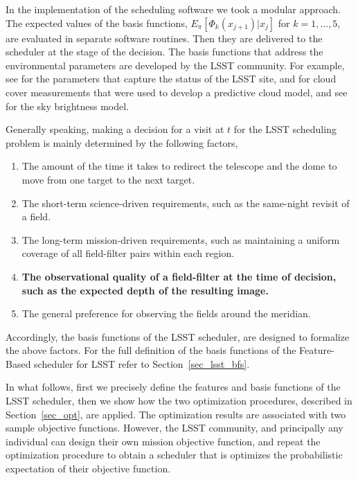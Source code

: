 \documentclass[12pt]{aastex62}
\theoremstyle{definition}
\begin{document}
In the implementation of the scheduling software we took a modular approach. The expected values of the basis functions, $E_{\pi}[\Phi_k(x_{j+1})|x_j]$ for $k=1,\dots, 5$, are evaluated in separate software routines. Then they are delivered to the scheduler at the stage of the decision. The basis functions that address the environmental parameters are developed by the LSST community. For example, see \citep{2014SPIE.9145E..1AG} for the parameters that capture the status of the LSST site, \citep{sebag2008lsst} and \citep{sebag2007lsst} for cloud cover measurements that were used to develop a predictive cloud model, and see \citep{yoachim2016optical} for the sky brightness model. 

Generally speaking, making a decision for a visit at $t$ for the LSST scheduling problem is mainly determined by the following factors,
\begin{enumerate}
\item The amount of the time it takes to redirect the telescope and the dome to move from one target to the next target.
\item The short-term science-driven requirements, such as the same-night revisit of a field.
\item The long-term mission-driven requirements, such as maintaining a uniform coverage of all field-filter pairs within each region.
\item {\bf The observational quality of a field-filter at the time of decision, such as the expected depth of the resulting image. \bf}
\item The general preference for observing the fields around the meridian.
\end{enumerate}

Accordingly, the basis functions of the LSST scheduler, are designed to formalize the above factors. For the full definition of the basis functions of the Feature-Based scheduler for LSST refer to Section~\ref{sec_lsst_bfs}.

In what follows, first we precisely define the features and basis functions of the LSST scheduler, then we show how the two optimization procedures, described in Section~\ref{sec_opt}, are applied. The optimization results are associated with two sample objective functions. However, the LSST community, and principally any individual can design their own mission objective function, and repeat the optimization procedure to obtain a scheduler that is optimizes the probabilistic expectation of their objective function.
\end{document}
